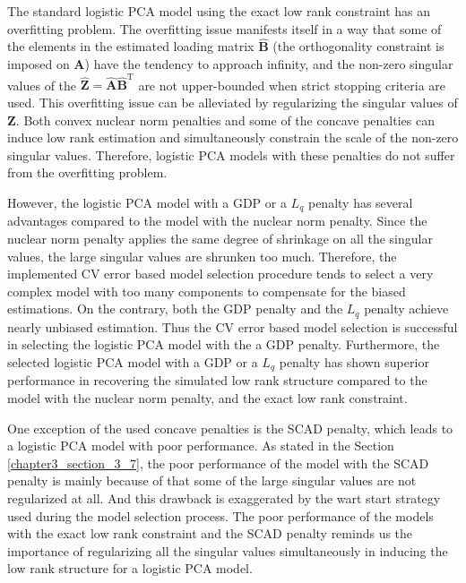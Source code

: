 The standard logistic PCA model using the exact low rank constraint has an overfitting problem. The overfitting issue manifests itself in a way that some of the elements in the estimated loading matrix $\hat{\mathbf{B}}$ (the orthogonality constraint is imposed on $\mathbf{A}$) have the tendency to approach infinity, and the non-zero singular values of the $\hat{\mathbf{Z}} = \hat{\mathbf{A}}\hat{\mathbf{B}}^{\text{T}}$ are not upper-bounded when strict stopping criteria are used. This overfitting issue can be alleviated by regularizing the singular values of $\mathbf{Z}$. Both convex nuclear norm penalties and some of the concave penalties can induce low rank estimation and simultaneously constrain the scale of the non-zero singular values. Therefore, logistic PCA models with these penalties do not suffer from the overfitting problem.

However, the logistic PCA model with a GDP or a $L_{q}$ penalty has several advantages compared to the model with the nuclear norm penalty. Since the nuclear norm penalty applies the same degree of shrinkage on all the singular values, the large singular values are shrunken too much. Therefore, the implemented CV error based model selection procedure tends to select a very complex model with too many components to compensate for the biased estimations. On the contrary, both the GDP penalty and the $L_{q}$ penalty achieve nearly unbiased estimation. Thus the CV error based model selection is successful in selecting the logistic PCA model with the a GDP penalty. Furthermore, the selected logistic PCA model with a GDP or a $L_{q}$ penalty has shown superior performance in recovering the simulated low rank structure compared to the model with the nuclear norm penalty, and the exact low rank constraint.

One exception of the used concave penalties is the SCAD penalty, which leads to a logistic PCA model with poor performance. As stated in the Section \ref{chapter3_section_3_7}, the poor performance of the model with the SCAD penalty is mainly because of that some of the large singular values are not regularized at all. And this drawback is exaggerated by the wart start strategy used during the model selection process. The poor performance of the models with the exact low rank constraint and the SCAD penalty reminds us the importance of regularizing all the singular values simultaneously in inducing the low rank structure for a logistic PCA model.

